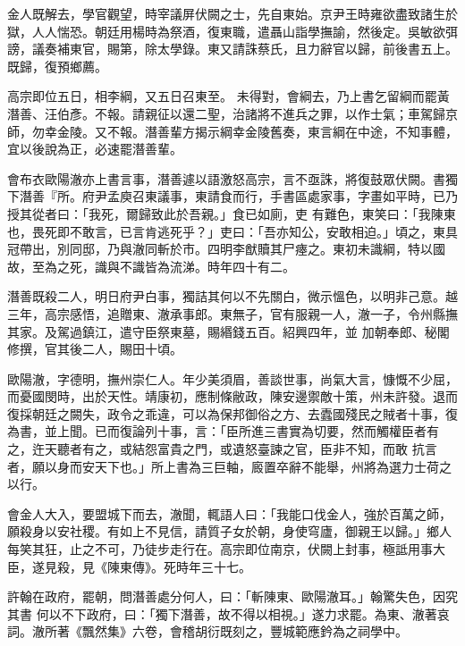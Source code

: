 \begin{pinyinscope}
 金人既解去，學官觀望，時宰議屏伏闕之士，先自東始。京尹王時雍欲盡致諸生於獄，人人惴恐。朝廷用楊時為祭酒，復東職，遣聶山詣學撫諭，然後定。吳敏欲弭謗，議奏補東官，賜第，除太學錄。東又請誅蔡氏，且力辭官以歸，前後書五上。既歸，復預鄉薦。



 高宗即位五日，相李綱，又五日召東至。
 未得對，會綱去，乃上書乞留綱而罷黃潛善、汪伯彥。不報。請親征以還二聖，治諸將不進兵之罪，以作士氣；車駕歸京師，勿幸金陵。又不報。潛善輩方揭示綱幸金陵舊奏，東言綱在中途，不知事體，宜以後說為正，必速罷潛善輩。



 會布衣歐陽澈亦上書言事，潛善遽以語激怒高宗，言不亟誅，將復鼓眾伏闕。書獨下潛善『所。府尹孟庾召東議事，東請食而行，手書區處家事，字畫如平時，已乃授其從者曰：「我死，爾歸致此於吾親。」食已如廁，吏
 有難色，東笑曰：「我陳東也，畏死即不敢言，已言肯逃死乎？」吏曰：「吾亦知公，安敢相迫。」頃之，東具冠帶出，別同邸，乃與澈同斬於市。四明李猷贖其尸瘞之。東初未識綱，特以國故，至為之死，識與不識皆為流涕。時年四十有二。



 潛善既殺二人，明日府尹白事，獨詰其何以不先關白，微示慍色，以明非己意。越三年，高宗感悟，追贈東、澈承事郎。東無子，官有服親一人，澈一子，令州縣撫其家。及駕過鎮江，遣守臣祭東墓，賜緡錢五百。紹興四年，並
 加朝奉郎、秘閣修撰，官其後二人，賜田十頃。



 歐陽澈，字德明，撫州崇仁人。年少美須眉，善談世事，尚氣大言，慷慨不少屈，而憂國閔時，出於天性。靖康初，應制條敝政，陳安邊禦敵十策，州未許發。退而復採朝廷之闕失，政令之乖違，可以為保邦御俗之方、去蠹國殘民之賊者十事，復為書，並上聞。已而復論列十事，言：「臣所進三書實為切要，然而觸權臣者有之，迕天聽者有之，或結怨富貴之門，或遺怒臺諫之官，臣非不知，而敢
 抗言者，願以身而安天下也。」所上書為三巨軸，廄置卒辭不能舉，州將為選力士荷之以行。



 會金人大入，要盟城下而去，澈聞，輒語人曰：「我能口伐金人，強於百萬之師，願殺身以安社稷。有如上不見信，請質子女於朝，身使穹廬，御親王以歸。」鄉人每笑其狂，止之不可，乃徒步走行在。高宗即位南京，伏闕上封事，極詆用事大臣，遂見殺，見《陳東傳》。死時年三十七。



 許翰在政府，罷朝，問潛善處分何人，曰：「斬陳東、歐陽澈耳。」翰驚失色，因究其書
 何以不下政府，曰：「獨下潛善，故不得以相視。」遂力求罷。為東、澈著哀詞。澈所著《飄然集》六卷，會稽胡衍既刻之，豐城範應鈐為之祠學中。




\end{pinyinscope}
